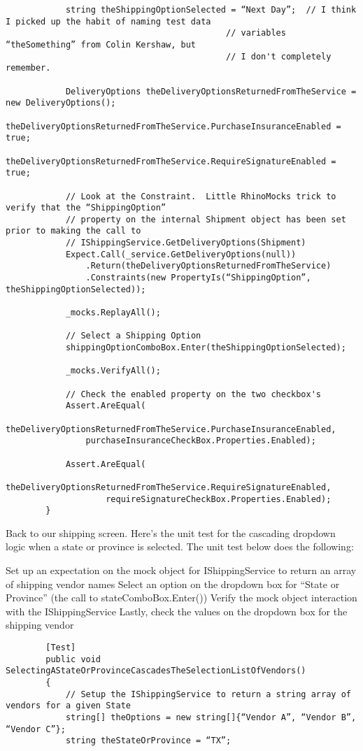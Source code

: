 \documentclass{article}
\begin{document}
{\begin{lstlisting}
            string theShippingOptionSelected = “Next Day”;  // I think I picked up the habit of naming test data
                                            // variables “theSomething” from Colin Kershaw, but
                                            // I don't completely remember. 

            DeliveryOptions theDeliveryOptionsReturnedFromTheService = new DeliveryOptions();
            theDeliveryOptionsReturnedFromTheService.PurchaseInsuranceEnabled = true;
            theDeliveryOptionsReturnedFromTheService.RequireSignatureEnabled = true; 

            // Look at the Constraint.  Little RhinoMocks trick to verify that the “ShippingOption”
            // property on the internal Shipment object has been set prior to making the call to
            // IShippingService.GetDeliveryOptions(Shipment)
            Expect.Call(_service.GetDeliveryOptions(null))
                .Return(theDeliveryOptionsReturnedFromTheService)
                .Constraints(new PropertyIs(“ShippingOption”, theShippingOptionSelected));

            _mocks.ReplayAll(); 

            // Select a Shipping Option
            shippingOptionComboBox.Enter(theShippingOptionSelected);

            _mocks.VerifyAll(); 

            // Check the enabled property on the two checkbox's
            Assert.AreEqual(
                theDeliveryOptionsReturnedFromTheService.PurchaseInsuranceEnabled,
                purchaseInsuranceCheckBox.Properties.Enabled); 

            Assert.AreEqual(
                    theDeliveryOptionsReturnedFromTheService.RequireSignatureEnabled,
                    requireSignatureCheckBox.Properties.Enabled);
        }
\end{lstlisting}
		
Back to our shipping screen.  Here's the unit test for the cascading dropdown logic when a state or province is selected.  The unit test below does the following:

    Set up an expectation on the mock object for IShippingService to return an array of shipping vendor names
    Select an option on the dropdown box for “State or Province” (the call to stateComboBox.Enter())
    Verify the mock object interaction with the IShippingService
    Lastly, check the values on the dropdown box for the shipping vendor
\begin{lstlisting}
        [Test]
        public void SelectingAStateOrProvinceCascadesTheSelectionListOfVendors()
        {
            // Setup the IShippingService to return a string array of vendors for a given State
            string[] theOptions = new string[]{“Vendor A”, “Vendor B”, “Vendor C”};
            string theStateOrProvince = “TX”;


\end{lstlisting}}
\end{document}
